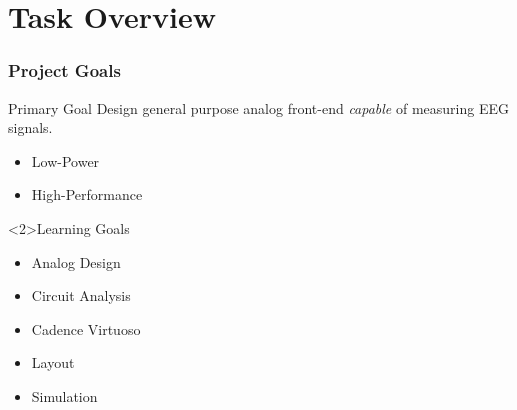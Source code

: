 \documentclass[../main.tex]{subfiles}
\begin{document}
\section{Task Overview}
\begin{frame}[t]
    \frametitle{Project Goals}

    \begin{block}{Primary Goal}
        Design general purpose analog front-end \textit{capable} of measuring EEG signals.
        \begin{itemize}
            \item Low-Power
            \item High-Performance
        \end{itemize}
    \end{block}

    \begin{block}<2>{Learning Goals}
        \begin{itemize}
            \item Analog Design
            \item Circuit Analysis
            \item Cadence Virtuoso
            \item Layout
            \item Simulation
        \end{itemize}
    \end{block}
\end{frame}
\end{document}
